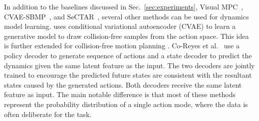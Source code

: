 In addition to the baselines discussed in Sec.~\ref{sec:experiments}, Visual MPC~\cite{Finn2017DeepVF}, CVAE-SBMP~\cite{ichter2018learning}, and SeCTAR~\cite{co2018self}, several other methods can be used for dynamics model learning. 
\cite{ichter2018learning} uses conditional variational autoencoder (CVAE) \cite{kingma2013auto, sohn2015learning} to learn a generative model to draw collision-free samples from the action space. This idea is further extended for collision-free motion planning \cite{ichter2019robot}. Co-Reyes et al.~\cite{co2018self} use a policy decoder to generate sequence of actions and a state decoder to predict the dynamics given the same latent feature as the input. The two decoders are jointly trained to encourage the predicted future states are consistent with the resultant states caused by the generated actions. Both decoders receive the same latent feature as input. The main notable difference is that most of these methods represent the probability distribution of a single action mode, where the data is often deliberate for the task. 



